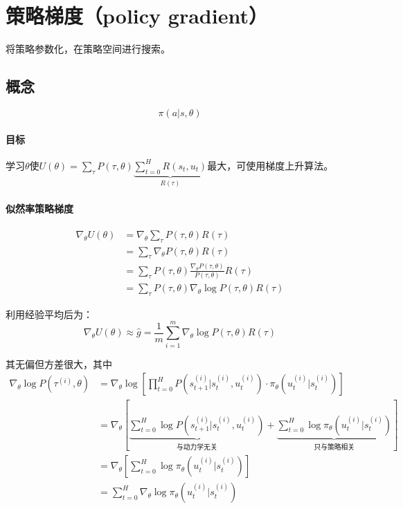 \documentclass[
12pt, %
a4paper, 
oneside, %
headinclude,footinclude, %
]{scrartcl}
\begin{document}
\section{策略梯度（policy gradient）}
将策略参数化，在策略空间进行搜索。
\subsection{概念}
$$ \pi(a|s, \theta) $$
\paragraph{目标}
学习$ \theta $使$ U(\theta) = \sum_{\tau} P(\tau, \theta) \underbrace{\sum_{t = 0}^H R(s_t, u_t)}_{R(\tau)} $最大，可使用梯度上升算法。
\paragraph{似然率策略梯度}
\begin{align*}
\nabla_\theta U(\theta) &= \nabla_\theta \sum_{\tau} P(\tau, \theta) R(\tau) \\
&= \sum_{\tau} \nabla_\theta P(\tau, \theta) R(\tau) \\
&= \sum_{\tau} P(\tau, \theta) \frac{\nabla_\theta P(\tau, \theta)}{P(\tau, \theta)} R(\tau) \\
&= \sum_{\tau} P(\tau, \theta) \nabla_\theta \log P(\tau, \theta) R(\tau)
\end{align*}

利用经验平均后为：
$$ \nabla_\theta U(\theta) \approx \hat{g} = \frac{1}{m} \sum_{i=1}^m \nabla_\theta \log P(\tau, \theta) R(\tau) $$

其无偏但方差很大，其中
\begin{align*}
\nabla_\theta\log P(\tau^{(i)}, \theta) &= \nabla_\theta\log[\prod_{t = 0}^{H} P(s_{t + 1}^{(i)}|s_t^{(i)},u_t^{(i)}) \cdot \pi_\theta(u_t^{(i)}|s_t^{(i)})] \\
&= \nabla_\theta[\underbrace{\sum_{t = 0}^{H} \log P(s_{t + 1}^{(i)}|s_t^{(i)},u_t^{(i)})}_{\text{与动力学无关}} + \underbrace{\sum_{t = 0}^{H}\log\pi_\theta(u_t^{(i)}|s_t^{(i)})}_{\text{只与策略相关}}] \\
&= \nabla_\theta[\sum_{t = 0}^{H} \log\pi_\theta(u_t^{(i)}|s_t^{(i)})] \\
&= \sum_{t = 0}^{H} \nabla_\theta\log\pi_\theta(u_t^{(i)}|s_t^{(i)})
\end{align*}
\end{document}
